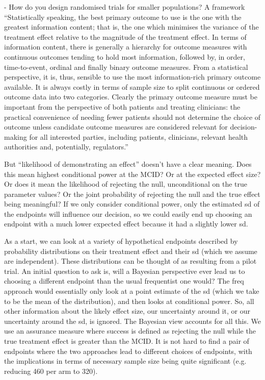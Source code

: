 \documentclass{article} %
\begin{document}
\cite{Parmar2016} - How do you design randomised trials for smaller populations? A framework
``Statistically speaking, the best primary outcome to use is the one with the greatest information content; that is, the one which minimises the variance of the treatment effect relative to the magnitude of the treatment effect. In terms of information content, there is generally a hierarchy for outcome measures with continuous outcomes tending to hold most information, followed by, in order, time-to-event, ordinal and finally binary outcome measures. From a statistical perspective, it is, thus, sensible to use the most information-rich primary outcome available. It is always costly in terms of sample size to split continuous or ordered outcome data into two categories. Clearly the primary outcome measure must be important from the perspective of both patients and treating clinicians: the practical convenience of needing fewer patients should not determine the choice of outcome unless candidate outcome measures are considered relevant for decision-making for all interested parties, including patients, clinicians, relevant health authorities and, potentially, regulators.''

But ``likelihood of demonstrating an effect'' doesn't have a clear meaning. Does this mean highest conditional power at the MCID? Or at the expected effect size? Or does it mean the likelihood of rejecting the null, unconditional on the true parameter values? Or the joint probability of rejecting the null and the true effect being meaningful? If we only consider conditional power, only the estimated sd of the endpoints will influence our decision, so we could easily end up choosing an endpoint with a much lower expected effect because it had a slightly lower sd.

As a start, we can look at a variety of hypothetical endpoints described by probability distributions on their treatment effect and their sd (which we assume are independent). These distributions can be thought of as resulting from a pilot trial. An initial question to ask is, will a Bayesian perspective ever lead us to choosing a different endpoint than the usual frequentist one would? The freq approach would essentially only look at a point estimate of the sd (which we take to be the mean of the distribution), and then looks at conditional power. So, all other information about the likely effect size, our uncertainty around it, or our uncertainty around the sd, is ignored. The Bayesian view accounts for all this. We use an assurance measure where success is defined as rejecting the null while the true treatment effect is greater than the MCID. It is not hard to find a pair of endpoints where the two approaches lead to different choices of endpoints, with the implications in terms of necessary sample size being quite significant (e.g. reducing 460 per arm to 320).
\end{document}
